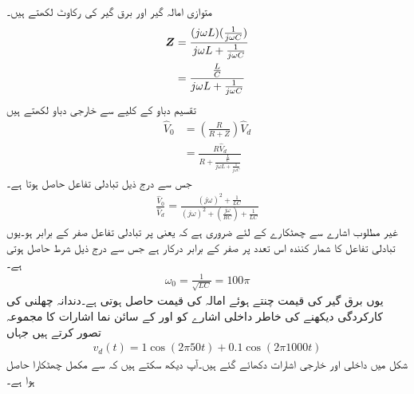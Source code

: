 متوازی امالہ گیر اور برق گیر کی رکاوٹ  لکھتے ہیں۔
\begin{align*}
{\ensuremath{{\boldsymbol{Z}}}}&=\frac{(j\omega L)(\frac{1}{j\omega C})}{j\omega L+\frac{1}{j\omega C}}\\
&=\frac{\frac{L}{C}}{j\omega L+ \frac{1}{j\omega C}}
\end{align*}
تقسیم دباو کے کلیے سے خارجی دباو لکھتے ہیں
\begin{align*}
\hat{V}_0&=\left(\frac{R}{R+Z}\right)\hat{V}_d\\
&=\frac{R \hat{V}_d}{R+\frac{\frac{L}{C}}{j\omega L+ \frac{1}{j\omega C}}}
\end{align*}
جس سے درج ذیل تبادلی تفاعل حاصل ہوتا ہے۔
\begin{align*}
\frac{\hat{V}_0}{\hat{V}_d}=\frac{(j\omega)^2+\frac{1}{LC}}{(j\omega)^2+\left(\frac{j\omega}{RC}\right)+\frac{1}{LC}}
\end{align*}
غیر مطلوب اشارے سے چھٹکارے کے لئے ضروری ہے کہ  یعنی  پر تبادلی تفاعل  صفر کے برابر ہو۔یوں تبادلی تفاعل کا شمار کنندہ اس تعدد پر صفر کے برابر درکار ہے جس سے درج ذیل شرط حاصل ہوتی ہے۔
\begin{align}
\omega_0=\frac{1}{\sqrt{LC}}=100\pi
\end{align}
یوں برق گیر کی قیمت  چنتے ہوئے امالہ کی قیمت  حاصل ہوتی ہے۔دندانہ چھلنی کی کارکردگی دیکھنے کی خاطر داخلی اشارے  کو  اور  کے سائن نما اشارات کا مجموعہ تصور کرتے ہیں جہاں 
\begin{align*}
v_d(t)=1\cos (2\pi 50 t)+0.1\cos(2\pi 1000 t)
\end{align*}
شکل میں داخلی اور خارجی اشارات دکھائے گئے ہیں۔آپ دیکھ سکتے ہیں کہ  سے مکمل چھٹکارا حاصل ہوا ہے۔ 
